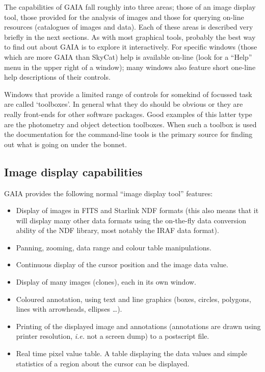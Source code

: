 \documentclass[twoside,11pt]{article}
\newcommand{\xref}[3]{#1}
\newcommand{\xlabel}[1]{}
\renewcommand{\_}{\texttt{\symbol{95}}}
\begin{document}
The capabilities of GAIA fall roughly into three areas; those of an
image display tool, those provided for the analysis of images and those
for querying on-line resources (catalogues of images and data). Each
of these areas is described very briefly in the next sections. As with
most graphical tools, probably the best way to find out about GAIA is
to explore it interactively. For specific windows (those which are
more GAIA than SkyCat) help is available on-line (look for a ``Help''
menu in the upper right of a window); many windows also
feature short one-line help descriptions of their controls.

Windows that provide a limited range of controls for somekind of
focussed task are called `toolboxes'. In general what they do should
be obvious or they are really front-ends for other software
packages. Good examples of this latter type are the photometry and
object detection toolboxes. When such a toolbox is used the
documentation for the command-line tools is the primary source for
finding out what is going on under the bonnet.

\subsection{\xlabel{image_display_capabilities}Image display capabilities}
GAIA provides the following normal ``image display tool'' features:
\begin{itemize}
\item Display of images in FITS and Starlink \xref{NDF}{sun33}{}
  formats (this also means that it will display many other data formats
  using the on-the-fly data conversion ability of the NDF library, most
  notably the IRAF data format).

\item Panning, zooming, data range and colour table manipulations.

\item Continuous display of the cursor position and the image data
  value.

\item Display of many images (clones), each in its own window.

\item Coloured annotation, using text and line graphics (boxes,
  circles, polygons, lines with arrowheads, ellipses \ldots).

\item Printing of the displayed image and annotations (annotations
  are drawn using printer resolution, \textit{i.e.} not a screen dump)
  to a postscript file.

\item Real time pixel value table. A table displaying the data
  values and simple statistics of a region about the cursor can be
  displayed.

\end{itemize}
\end{document}
